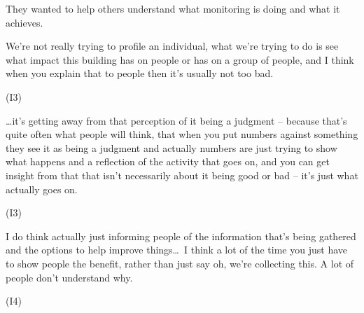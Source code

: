They wanted to help others understand what monitoring is doing and
what it achieves.

\begin{qt}We’re not really
trying to profile an individual, what we’re trying to do is see what
impact this building has on people or has on a group of people, and I
think when you explain that to people then it’s usually not too bad.\end{qt}
(I3)

\begin{qt}\ldots it’s getting away from that perception of it being a judgment –
because that’s quite often what people will think, that when you put
numbers against something they see it as being a judgment and actually
numbers are just trying to show what happens and a reflection of the
activity that goes on, and you can get insight from that that isn’t
necessarily about it being good or bad – it’s just what actually goes
on.\end{qt} (I3)

\begin{qt}I do think actually just informing people of the information that’s
being gathered and the options to help improve things\ldots\  I think a lot
of the time you just have to show people the benefit, rather than just
say oh, we’re collecting this. A lot of people don’t understand why.\end{qt}
(I4)

